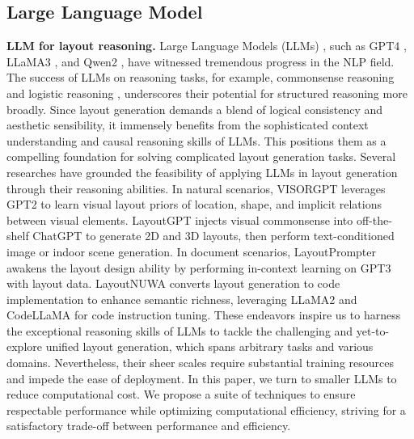 \subsection{Large Language Model}
\label{sec::rw_llm}
\textbf{LLM for layout reasoning.} Large Language Models (LLMs) \cite{zhao2023survey}, such as GPT4 \cite{gpt42023}, LLaMA3 \cite{llama32024dubey}, and Qwen2 \cite{qwen22024yang}, have witnessed tremendous progress in the NLP field. The success of LLMs on reasoning tasks, for example, commonsense reasoning \cite{causalreason2011aaai,levesque2012winograd} and logistic reasoning \cite{nijkamp2023codegen,phi12023gunasekar,phi1.52023li}, underscores their potential for structured reasoning more broadly. Since layout generation demands a blend of logical consistency and aesthetic sensibility, it immensely benefits from the sophisticated context understanding and causal reasoning skills of LLMs. This positions them as a compelling foundation for solving complicated layout generation tasks. Several researches have grounded the feasibility of applying LLMs in layout generation through their reasoning abilities. In natural scenarios, VISORGPT \cite{visorgpt2023xie} leverages GPT2 \cite{gpt22019radford} to learn visual layout priors of location, shape, and implicit relations between visual elements. LayoutGPT \cite{layoutgpt2023feng} injects visual commonsense into off-the-shelf ChatGPT \cite{chatgpt2022ouyang} to generate 2D and 3D layouts, then perform text-conditioned image or indoor scene generation. In document scenarios, LayoutPrompter \cite{layoutprompter2023lin} awakens the layout design ability by performing in-context learning on GPT3 with layout data. LayoutNUWA \cite{layoutnuwa2024tang} converts layout generation to code implementation to enhance semantic richness, leveraging LLaMA2 and CodeLLaMA for code instruction tuning. These endeavors inspire us to harness the exceptional reasoning skills of LLMs to tackle the challenging and yet-to-explore unified layout generation, which spans arbitrary tasks and various domains. Nevertheless, their sheer scales require substantial training resources and impede the ease of deployment. In this paper, we turn to smaller LLMs to reduce computational cost. We propose a suite of techniques to ensure respectable performance while optimizing computational efficiency, striving for a satisfactory trade-off between performance and efficiency.


